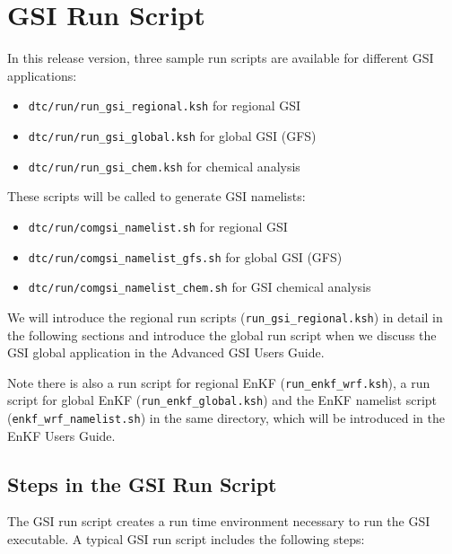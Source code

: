 \section{GSI Run Script}

In this release version, three sample run scripts are available for different GSI applications: 

\begin{itemize}
\item \verb|dtc/run/run_gsi_regional.ksh|  for regional GSI
\item \verb|dtc/run/run_gsi_global.ksh|  for global GSI (GFS)
\item \verb|dtc/run/run_gsi_chem.ksh| for chemical analysis
\end{itemize}

These scripts will be called to generate GSI namelists:
\begin{itemize}
\item \verb|dtc/run/comgsi_namelist.sh| for regional GSI
\item \verb|dtc/run/comgsi_namelist_gfs.sh| for global GSI (GFS)
\item \verb|dtc/run/comgsi_namelist_chem.sh| for GSI chemical analysis
\end{itemize}

We will introduce the regional run scripts (\verb|run_gsi_regional.ksh|) in detail in the following sections and introduce the global run script when we discuss the GSI global application in the Advanced GSI User\textquotesingle s Guide. 

Note there is also a run script for regional EnKF (\verb|run_enkf_wrf.ksh|), a run script for global EnKF (\verb|run_enkf_global.ksh|) and the EnKF namelist script (\verb|enkf_wrf_namelist.sh|) in the same directory, which will be introduced in the EnKF User\textquotesingle s Guide.

\subsection{Steps in the GSI Run Script} 

The GSI run script creates a run time environment necessary to run the GSI executable. A typical GSI run script includes the following steps:

